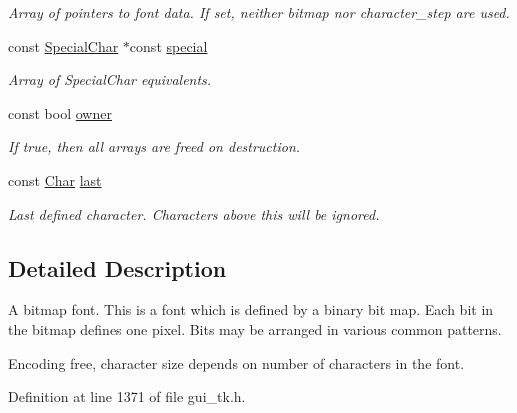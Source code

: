 \begin{DoxyCompactItemize}
\begin{DoxyCompactList}\small\item\em Array of pointers to font data. If set, neither {\itshape bitmap\/} nor {\itshape character\-\_\-step\/} are used. \end{DoxyCompactList}\item 
const \hyperlink{classGUI_1_1Font_af3c234cd3febe27dbe9c76e6cc5cad3a}{Special\-Char} $\ast$const \hyperlink{classGUI_1_1BitmapFont_a46f912c496e902dfc614e25261599718}{special}
\begin{DoxyCompactList}\small\item\em Array of Special\-Char equivalents. \end{DoxyCompactList}\item 
\hypertarget{classGUI_1_1BitmapFont_ac50042f33fedf2c8516294780ed6f128}{const bool \hyperlink{classGUI_1_1BitmapFont_ac50042f33fedf2c8516294780ed6f128}{owner}}\label{classGUI_1_1BitmapFont_ac50042f33fedf2c8516294780ed6f128}

\begin{DoxyCompactList}\small\item\em If {\ttfamily true}, then all arrays are freed on destruction. \end{DoxyCompactList}\item 
\hypertarget{classGUI_1_1BitmapFont_a3c992d29bbd0d35087365a8e5474686c}{const \hyperlink{namespaceGUI_af6b04b46d40197b4f00e553d7d1a3e4c}{Char} \hyperlink{classGUI_1_1BitmapFont_a3c992d29bbd0d35087365a8e5474686c}{last}}\label{classGUI_1_1BitmapFont_a3c992d29bbd0d35087365a8e5474686c}

\begin{DoxyCompactList}\small\item\em Last defined character. Characters above this will be ignored. \end{DoxyCompactList}\end{DoxyCompactItemize}


\subsection{Detailed Description}
A bitmap font. This is a font which is defined by a binary bit map. Each bit in the bitmap defines one pixel. Bits may be arranged in various common patterns. 

Encoding free, character size depends on number of characters in the font. 

Definition at line 1371 of file gui\-\_\-tk.\-h.



